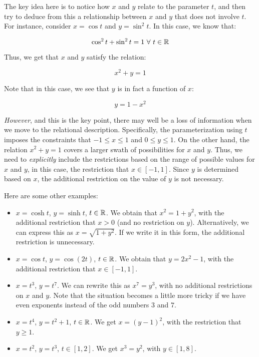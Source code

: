 \documentclass[10pt]{amsart}
\begin{document}
The key idea here is to notice how $x$ and $y$ relate to the parameter
$t$, and then try to deduce from this a relationship between $x$ and
$y$ that does not involve $t$. For instance, consider $x = \cos t$ and
$y = \sin^2t$. In this case, we know that:

$$\cos^2 t + \sin^2 t = 1 \ \forall \ t \in \mathbb{R}$$

Thus, we get that $x$ and $y$ satisfy the relation:

$$x^2 + y = 1$$

Note that in this case, we see that $y$ is in fact a function of $x$:

$$y = 1 - x^2$$

{\em However}, and this is the key point, there may well be a loss of
information when we move to the relational description. Specifically,
the parameterization using $t$ imposes the constraints that $-1 \le x
\le 1$ and $0 \le y \le 1$. On the other hand, the relation $x^2 + y =
1$ covers a larger swath of possibilities for $x$ and $y$. Thus, we
need to {\em explicitly} include the restrictions based on the range
of possible values for $x$ and $y$, in this case, the restriction that
$x \in [-1,1]$. Since $y$ is determined based on $x$, the additional
restriction on the value of $y$ is not necessary.

Here are some other examples:

\begin{itemize}
\item $x = \cosh t$, $y = \sinh t$, $t \in \mathbb{R}$. We obtain that $x^2 =
  1 + y^2$, with the additional restriction that $x > 0$ (and no
  restriction on $y$). Alternatively, we can express this as $x =
  \sqrt{1 + y^2}$. If we write it in this form, the additional
  restriction is unnecessary.
\item $x = \cos t$, $y = \cos(2t)$, $t \in \mathbb{R}$. We obtain that $y =
  2x^2 - 1$, with the additional restriction that $x \in [-1,1]$.
\item $x = t^3$, $y = t^7$. We can rewrite this as $x^7 = y^3$, with
  no additional restrictions on $x$ and $y$. Note that the situation
  becomes a little more tricky if we have even exponents instead of
  the odd numbers $3$ and $7$.
\item $x = t^4$, $y = t^2 + 1$, $t \in \mathbb{R}$. We get $x = (y - 1)^2$,
  with the restriction that $y \ge 1$. 
\item $x = t^2$, $y = t^3$, $t \in [1,2]$. We get $x^3 = y^2$, with $y
  \in [1,8]$. 
\end{itemize}
\end{document}
